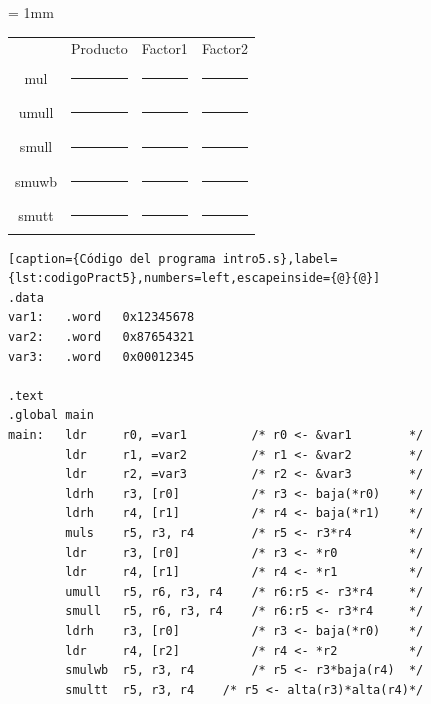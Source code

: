 \begin{center}
\small
\colorbox[gray]{0.9}{
\tabcolsep = 1mm
\begin{tabular}{cccc}
& Producto & Factor1 & Factor2 \\
mul & 
\colorbox[gray]{1}{\rule{4cm}{0cm}\rule{0cm}{0.46cm}} &
\colorbox[gray]{1}{\rule{2cm}{0cm}\rule{0cm}{0.46cm}} &
\colorbox[gray]{1}{\rule{2cm}{0cm}\rule{0cm}{0.46cm}} \\
umull & 
\colorbox[gray]{1}{\rule{4cm}{0cm}\rule{0cm}{0.46cm}} &
\colorbox[gray]{1}{\rule{2cm}{0cm}\rule{0cm}{0.46cm}} &
\colorbox[gray]{1}{\rule{2cm}{0cm}\rule{0cm}{0.46cm}} \\
smull & 
\colorbox[gray]{1}{\rule{4cm}{0cm}\rule{0cm}{0.46cm}} &
\colorbox[gray]{1}{\rule{2cm}{0cm}\rule{0cm}{0.46cm}} &
\colorbox[gray]{1}{\rule{2cm}{0cm}\rule{0cm}{0.46cm}} \\
smuwb & 
\colorbox[gray]{1}{\rule{4cm}{0cm}\rule{0cm}{0.46cm}} &
\colorbox[gray]{1}{\rule{2cm}{0cm}\rule{0cm}{0.46cm}} &
\colorbox[gray]{1}{\rule{2cm}{0cm}\rule{0cm}{0.46cm}} \\
smutt & 
\colorbox[gray]{1}{\rule{4cm}{0cm}\rule{0cm}{0.46cm}} &
\colorbox[gray]{1}{\rule{2cm}{0cm}\rule{0cm}{0.46cm}} &
\colorbox[gray]{1}{\rule{2cm}{0cm}\rule{0cm}{0.46cm}} \\
\end{tabular}
}
\end{center}

\begin{lstlisting}[caption={Código del programa intro5.s},label={lst:codigoPract5},numbers=left,escapeinside={@}{@}]
.data
var1:   .word   0x12345678
var2:   .word   0x87654321
var3:   .word   0x00012345

.text
.global main
main:   ldr     r0, =var1         /* r0 <- &var1        */
        ldr     r1, =var2         /* r1 <- &var2        */
        ldr     r2, =var3         /* r2 <- &var3        */
        ldrh    r3, [r0]          /* r3 <- baja(*r0)    */
        ldrh    r4, [r1]          /* r4 <- baja(*r1)    */
        muls    r5, r3, r4        /* r5 <- r3*r4        */
        ldr     r3, [r0]          /* r3 <- *r0          */
        ldr     r4, [r1]          /* r4 <- *r1          */
        umull   r5, r6, r3, r4    /* r6:r5 <- r3*r4     */
        smull   r5, r6, r3, r4    /* r6:r5 <- r3*r4     */
        ldrh    r3, [r0]          /* r3 <- baja(*r0)    */
        ldr     r4, [r2]          /* r4 <- *r2          */
        smulwb  r5, r3, r4        /* r5 <- r3*baja(r4)  */
        smultt  r5, r3, r4    /* r5 <- alta(r3)*alta(r4)*/
\end{lstlisting}



\chapterend{}

